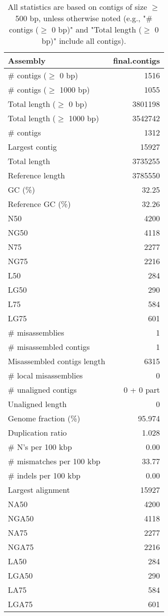 \documentclass[12pt,a4paper]{article}
\begin{document}
\begin{table}[ht]
\begin{center}
\caption{All statistics are based on contigs of size $\geq$ 500 bp, unless otherwise noted (e.g., "\# contigs ($\geq$ 0 bp)" and "Total length ($\geq$ 0 bp)" include all contigs).}
\begin{tabular}{|l*{1}{|r}|}
\hline
Assembly & final.contigs \\ \hline
\# contigs ($\geq$ 0 bp) & 1516 \\ \hline
\# contigs ($\geq$ 1000 bp) & 1055 \\ \hline
Total length ($\geq$ 0 bp) & 3801198 \\ \hline
Total length ($\geq$ 1000 bp) & 3542742 \\ \hline
\# contigs & 1312 \\ \hline
Largest contig & 15927 \\ \hline
Total length & 3735255 \\ \hline
Reference length & 3785550 \\ \hline
GC (\%) & 32.25 \\ \hline
Reference GC (\%) & 32.26 \\ \hline
N50 & 4200 \\ \hline
NG50 & 4118 \\ \hline
N75 & 2277 \\ \hline
NG75 & 2216 \\ \hline
L50 & 284 \\ \hline
LG50 & 290 \\ \hline
L75 & 584 \\ \hline
LG75 & 601 \\ \hline
\# misassemblies & 1 \\ \hline
\# misassembled contigs & 1 \\ \hline
Misassembled contigs length & 6315 \\ \hline
\# local misassemblies & 0 \\ \hline
\# unaligned contigs & 0 + 0 part \\ \hline
Unaligned length & 0 \\ \hline
Genome fraction (\%) & 95.974 \\ \hline
Duplication ratio & 1.028 \\ \hline
\# N's per 100 kbp & 0.00 \\ \hline
\# mismatches per 100 kbp & 33.77 \\ \hline
\# indels per 100 kbp & 0.00 \\ \hline
Largest alignment & 15927 \\ \hline
NA50 & 4200 \\ \hline
NGA50 & 4118 \\ \hline
NA75 & 2277 \\ \hline
NGA75 & 2216 \\ \hline
LA50 & 284 \\ \hline
LGA50 & 290 \\ \hline
LA75 & 584 \\ \hline
LGA75 & 601 \\ \hline
\end{tabular}
\end{center}
\end{table}
\end{document}

